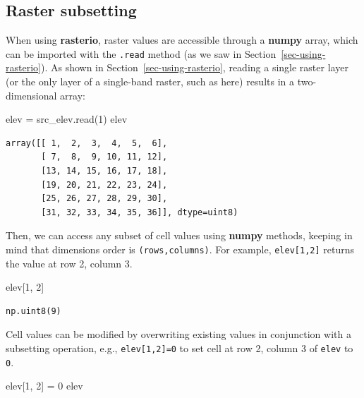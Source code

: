 \documentclass[
  letterpaper,
]{krantz}
\newenvironment{Shaded}{\begin{snugshade}}{\end{snugshade}}
\newcommand{\DecValTok}[1]{\textcolor[rgb]{0.68,0.00,0.00}{#1}}
\newcommand{\NormalTok}[1]{\textcolor[rgb]{0.00,0.23,0.31}{#1}}
\newcommand{\OperatorTok}[1]{\textcolor[rgb]{0.37,0.37,0.37}{#1}}
\begin{document}
\subsection{Raster subsetting}\label{sec-raster-subsetting}

When using \textbf{rasterio}, raster values are accessible through a
\textbf{numpy} array, which can be imported with the \texttt{.read}
method (as we saw in Section~\ref{sec-using-rasterio}). As shown in
Section~\ref{sec-using-rasterio}, reading a single raster layer (or the
only layer of a single-band raster, such as here) results in a
two-dimensional array:

\begin{Shaded}
\begin{Highlighting}[]
\NormalTok{elev }\OperatorTok{=}\NormalTok{ src\_elev.read(}\DecValTok{1}\NormalTok{)}
\NormalTok{elev}
\end{Highlighting}
\end{Shaded}

\begin{verbatim}
array([[ 1,  2,  3,  4,  5,  6],
       [ 7,  8,  9, 10, 11, 12],
       [13, 14, 15, 16, 17, 18],
       [19, 20, 21, 22, 23, 24],
       [25, 26, 27, 28, 29, 30],
       [31, 32, 33, 34, 35, 36]], dtype=uint8)
\end{verbatim}

Then, we can access any subset of cell values using \textbf{numpy}
methods, keeping in mind that dimensions order is
\texttt{(rows,columns)}. For example, \texttt{elev{[}1,2{]}} returns the
value at row 2, column 3.

\begin{Shaded}
\begin{Highlighting}[]
\NormalTok{elev[}\DecValTok{1}\NormalTok{, }\DecValTok{2}\NormalTok{]}
\end{Highlighting}
\end{Shaded}

\begin{verbatim}
np.uint8(9)
\end{verbatim}

Cell values can be modified by overwriting existing values in
conjunction with a subsetting operation, e.g., \texttt{elev{[}1,2{]}=0}
to set cell at row 2, column 3 of \texttt{elev} to \texttt{0}.

\begin{Shaded}
\begin{Highlighting}[]
\NormalTok{elev[}\DecValTok{1}\NormalTok{, }\DecValTok{2}\NormalTok{] }\OperatorTok{=} \DecValTok{0}
\NormalTok{elev}
\end{Highlighting}
\end{Shaded}
\end{document}
